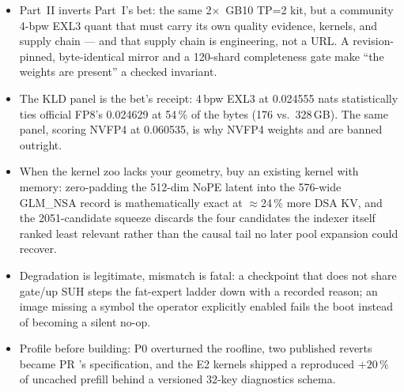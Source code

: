 \begin{itemize}
  \item Part~II inverts Part~I's bet: the same 2$\times$~GB10 TP=2 kit, but
    a community 4-bpw EXL3 quant that must carry its own quality evidence,
    kernels, and supply chain --- and that supply chain is engineering, not
    a URL. A revision-pinned, byte-identical mirror and a 120-shard
    completeness gate make ``the weights are present'' a checked invariant.
  \item The KLD panel is the bet's receipt: 4\,bpw EXL3 at 0.024555 nats
    statistically ties official FP8's 0.024629 at 54\,\% of the bytes
    (176 vs.\ 328\,GB). The same panel, scoring NVFP4 at 0.060535, is why
    NVFP4 weights and  are banned outright.
  \item When the kernel zoo lacks your geometry, buy an existing kernel
    with memory: zero-padding the 512-dim NoPE latent into the 576-wide
    GLM\_NSA record is mathematically exact at $\approx$24\,\% more DSA KV,
    and the 2051-candidate squeeze discards the four candidates the indexer
    itself ranked least relevant rather than the causal tail no later pool
    expansion could recover.
  \item Degradation is legitimate, mismatch is fatal: a checkpoint that
    does not share gate/up SUH steps the fat-expert ladder down with a
    recorded reason; an image missing a symbol the operator explicitly
    enabled fails the boot instead of becoming a silent no-op.
  \item Profile before building: P0 overturned the roofline, two published
    reverts became PR 's specification, and the E2 kernels
    shipped a reproduced $+20$\,\% of uncached prefill behind a versioned
    32-key diagnostics schema.
\end{itemize}


